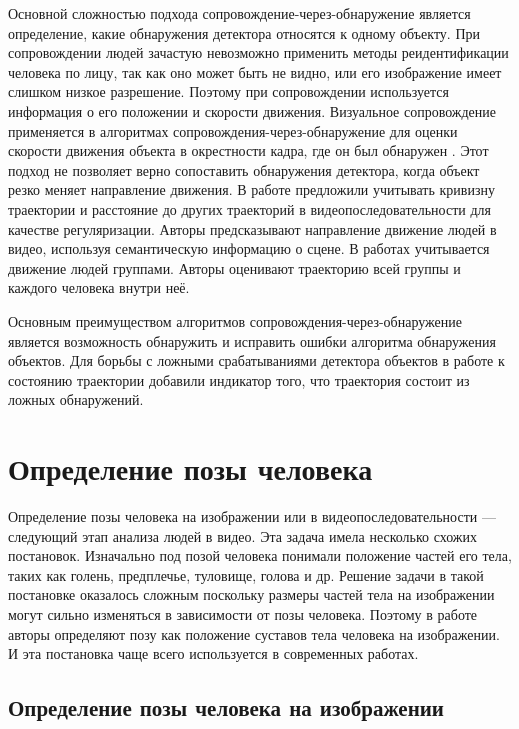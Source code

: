 Основной сложностью подхода сопровождение-через-обнаружение является определение, какие обнаружения детектора относятся к одному объекту. При сопровождении людей зачастую невозможно применить методы реидентификации человека по лицу, так как оно может быть не видно, или его изображение имеет слишком низкое разрешение. Поэтому при сопровождении используется информация о его положении и скорости движения. Визуальное сопровождение применяется в алгоритмах сопровождения-через-обнаружение для оценки скорости движения объекта в окрестности кадра, где он был обнаружен \cite{benfold2011stable,izadinia20122t}. Этот подход не позволяет верно сопоставить обнаружения детектора, когда объект резко меняет направление движения. В работе \cite{milan2013detection} предложили учитывать кривизну траектории и расстояние до других траекторий в видеопоследовательности для качестве регуляризации. Авторы \cite{gong2011multi} предсказывают направление движение людей в видео, используя семантическую информацию о сцене. В работах \cite{leal2011everybody,choi2012unified} учитывается движение людей группами. Авторы оценивают траекторию всей группы и каждого человека внутри неё.

Основным преимуществом алгоритмов сопровождения-через-обнаружение является возможность обнаружить и исправить ошибки алгоритма обнаружения объектов. Для борьбы с ложными срабатываниями детектора объектов в работе \cite{benfold2011stable} к состоянию траектории добавили индикатор того, что траектория состоит из ложных обнаружений. 

\section{Определение позы человека} \label{chapt-related::human_pose_definithion}

Определение позы человека на изображении или в видеопоследовательности --- следующий этап анализа людей в видео. Эта задача имела несколько схожих постановок. Изначально под позой человека понимали положение частей его тела, таких как голень, предплечье, туловище, голова и др. Решение задачи в такой постановке оказалось сложным поскольку размеры частей тела на изображении могут сильно изменяться в зависимости от позы человека. Поэтому в работе \cite{yang2011articulated} авторы определяют позу как положение суставов тела человека на изображении. И эта постановка чаще всего используется в современных работах.

\subsection{Определение позы человека на изображении}


